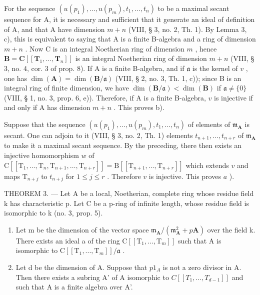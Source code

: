 For the sequence \((u(p_1), \ldots, u(p_m), t_1, \ldots, t_n)\) to be a maximal secant sequence for A, it is necessary and sufficient that it generate an ideal of definition of A, and that A have dimension \(m + n\) (VIII, § 3, no. 2, Th. 1). By Lemma 3, c), this is equivalent to saying that A is a finite B-algebra and a ring of dimension \(m + n\) . Now C is an integral Noetherian ring of dimension \(m\) , hence \(\mathbf{B} = \mathbf{C}[[\mathbf{T}_1, \ldots, \mathbf{T}_n]]\) is an integral Noetherian ring of dimension \(m + n\) (VIII, § 3, no. 4, cor. 3 of prop. 8). If A is a finite B-algebra, and if \(\mathfrak{a}\) is the kernel of \(v\) , one has \(\dim(\mathbf{A}) = \dim(\mathbf{B}/\mathfrak{a})\) (VIII, § 2, no. 3, Th. 1, c)); since B is an integral ring of finite dimension, we have \(\dim(\mathbf{B}/\mathfrak{a}) < \dim(\mathbf{B})\) if \(\mathfrak{a} \neq \{0\}\) (VIII, § 1, no. 3, prop. 6, e)). Therefore, if A is a finite B-algebra, \(v\) is injective if and only if A has dimension \(m + n\) . This proves b).

Suppose that the sequence \((u(p_1), \ldots, u(p_m), t_1, \ldots, t_n)\) of elements of \(\mathfrak{m}_{\mathbf{A}}\) is secant. One can adjoin to it (VIII, § 3, no. 2, Th. 1) elements \(t_{n+1}, \ldots, t_{n+r}\) of \(\mathfrak{m}_{\mathbf{A}}\) to make it a maximal secant sequence. By the preceding, there then exists an injective homomorphism \(w\) of \(\mathrm{C}[[\mathrm{T}_1, \ldots, \mathrm{T}_n, \mathrm{T}_{n+1}, \ldots, \mathrm{T}_{n+r}]] = \mathrm{B}[[\mathrm{T}_{n+1}, \ldots, \mathrm{T}_{n+r}]]\) which extends \(v\) and maps \(\mathrm{T}_{n+j}\) to \(t_{n+j}\) for \(1 \leqslant j \leqslant r\) . Therefore \(v\) is injective. This proves \(a\) ).

THEOREM 3. --- Let A be a local, Noetherian, complete ring whose residue field k has characteristic p. Let C be a p-ring of infinite length, whose residue field is isomorphic to k (no. 3, prop. 5).

\begin{enumerate}
\def\labelenumi{\alph{enumi})}
\item
  Let m be the dimension of the vector space \(\mathfrak{m}_{\mathbf{A}}/(\mathfrak{m}_{\mathbf{A}}^{2} + p\mathbf{A})\) over the field k. There exists an ideal a of the ring \(\mathrm{C}[[\mathrm{T}_{1}, ..., \mathrm{T}_{m}]]\) such that A is isomorphic to \(\mathrm{C}[[\mathrm{T}_{1}, ..., \mathrm{T}_{m}]]/\mathfrak{a}\) .
\item
  Let d be the dimension of A. Suppose that \(p1_{A}\) is not a zero divisor in A. Then there exists a subring A' of A isomorphic to \(C[[T_{1}, \ldots, T_{d-1}]]\) and such that A is a finite algebra over A'.
\end{enumerate}

